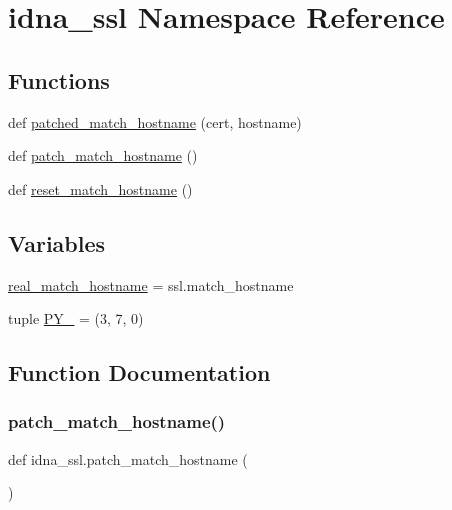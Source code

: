 \hypertarget{namespaceidna__ssl}{}\section{idna\+\_\+ssl Namespace Reference}
\label{namespaceidna__ssl}
\subsection*{Functions}
\begin{DoxyCompactItemize}
\item 
def \hyperlink{namespaceidna__ssl_ae4869597ccc4870cc4e27f1b77b917d7}{patched\+\_\+match\+\_\+hostname} (cert, hostname)
\item 
def \hyperlink{namespaceidna__ssl_a6496808221ba236c2624494dab23c7af}{patch\+\_\+match\+\_\+hostname} ()
\item 
def \hyperlink{namespaceidna__ssl_ac475db4cd99a9cdb38601fda9174f0e7}{reset\+\_\+match\+\_\+hostname} ()
\end{DoxyCompactItemize}
\subsection*{Variables}
\begin{DoxyCompactItemize}
\item 
\hyperlink{namespaceidna__ssl_a3c6c655dd853b7e980171d3cba545e22}{real\+\_\+match\+\_\+hostname} = ssl.\+match\+\_\+hostname
\item 
tuple \hyperlink{namespaceidna__ssl_ac8352712b4fbcee52dbaf91c2fbfc91d}{P\+Y\+\_} = (3, 7, 0)
\end{DoxyCompactItemize}


\subsection{Function Documentation}
\mbox{\label{namespaceidna__ssl_a6496808221ba236c2624494dab23c7af}} 
\subsubsection{\texorpdfstring{patch\+\_\+match\+\_\+hostname()}{patch\_match\_hostname()}}
{\footnotesize\ttfamily def idna\+\_\+ssl.\+patch\+\_\+match\+\_\+hostname (\begin{DoxyParamCaption}{ }\end{DoxyParamCaption})}

